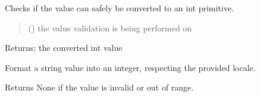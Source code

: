 \documentclass[letterpaper,10pt,english]{sphinxmanual}
\begin{document}
\begin{fulllineitems}
\begin{fulllineitems}
\label{\detokenize{apache_commons_validator_python:apache_commons_validator_python.generic_type_validator_new.GenericTypeValidator.format_int}}
\pysigstartsignatures
{}
\pysigstopsignatures
\sphinxAtStartPar
Checks if the value can safely be converted to an int primitive.
\begin{quote}\begin{description}
\sphinxAtStartPar
{} () \textendash{} the value validation is being performed on

\end{description}\end{quote}

\sphinxAtStartPar
Returns: the converted int value

\end{fulllineitems}


\begin{fulllineitems}
\label{\detokenize{apache_commons_validator_python:apache_commons_validator_python.generic_type_validator_new.GenericTypeValidator.format_int_locale}}
\pysigstartsignatures
{}
\pysigstopsignatures
\sphinxAtStartPar
Format a string value into an integer, respecting the provided locale.

\sphinxAtStartPar
Returns None if the value is invalid or out of range.


\end{fulllineitems}
\end{fulllineitems}
\end{document}
